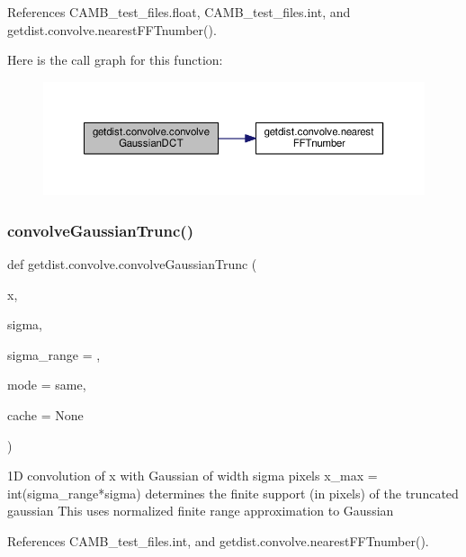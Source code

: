 References C\+A\+M\+B\+\_\+test\+\_\+files.\+float, C\+A\+M\+B\+\_\+test\+\_\+files.\+int, and getdist.\+convolve.\+nearest\+F\+F\+Tnumber().

Here is the call graph for this function\+:
\nopagebreak
\begin{figure}[H]
\begin{center}
\leavevmode
\includegraphics[width=350pt]{namespacegetdist_1_1convolve_acf5c938da0fecbf932f13c93050fd706_cgraph}
\end{center}
\end{figure}
\mbox{\label{namespacegetdist_1_1convolve_a815e19f42beb6147c053ece0d742b4b2}} 
\subsubsection{\texorpdfstring{convolve\+Gaussian\+Trunc()}{convolveGaussianTrunc()}}
{\footnotesize\ttfamily def getdist.\+convolve.\+convolve\+Gaussian\+Trunc (\begin{DoxyParamCaption}\item[{}]{x,  }\item[{}]{sigma,  }\item[{}]{sigma\+\_\+range = {},  }\item[{}]{mode = {\ttfamily \textquotesingle{}same\textquotesingle{}},  }\item[{}]{cache = {\ttfamily None} }\end{DoxyParamCaption})}

\begin{DoxyVerb}1D convolution of x with Gaussian of width sigma pixels
x_max = int(sigma_range*sigma) determines the finite support (in pixels) of the truncated gaussian
This uses normalized finite range approximation to Gaussian
\end{DoxyVerb}
 

References C\+A\+M\+B\+\_\+test\+\_\+files.\+int, and getdist.\+convolve.\+nearest\+F\+F\+Tnumber().

